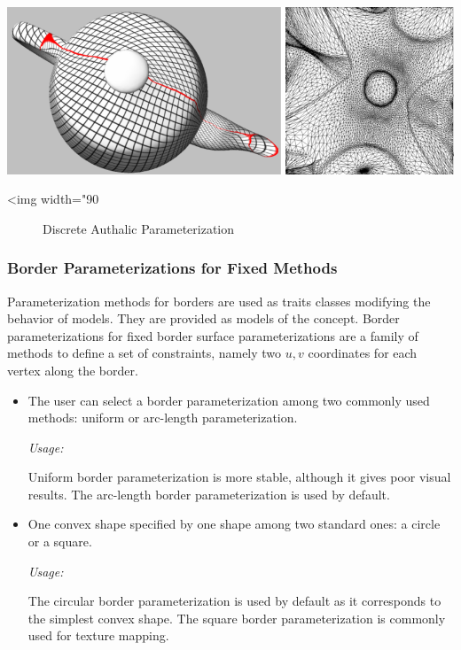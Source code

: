 \begin{center}
    \label{Surface_mesh_parameterization-fig-authalic}
    \begin{ccTexOnly}
        \includegraphics[width=1.0\textwidth]{Surface_mesh_parameterization/authalic}
    \end{ccTexOnly}
    \begin{ccHtmlOnly}
        <img width="90%
    \end{ccHtmlOnly}
    \begin{figure}[h]
        \caption{Discrete Authalic Parameterization}
    \end{figure}
\end{center}

\subsubsection{Border Parameterizations for Fixed Methods}
\label{sec:Border-Parameterizations-for-Fixed-Methods}

Parameterization methods for
borders are used as traits classes modifying the behavior of
 models.
They are provided as models of the  concept. Border parameterizations for fixed border surface parameterizations
are a family of methods to define a set of constraints, namely two
$u,v$ coordinates for each vertex along the border.

\begin{itemize}

\item
    The user can select a border parameterization among
    two commonly used methods: uniform or arc-length parameterization.

    \emph{Usage:}

    Uniform border parameterization is more stable, although it gives
    poor visual results. The
    arc-length border parameterization is used by default.

\item
    One convex shape specified by one shape among two standard ones:
    a circle or a square.

    \emph{Usage:}

    The circular border parameterization is used by default as it
    corresponds to the simplest convex shape. The square border
    parameterization is commonly used for texture mapping.

\end{itemize}

